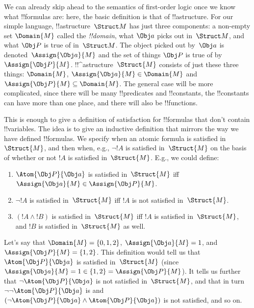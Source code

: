 \documentclass[../../../include/open-logic-section]{subfiles}
\begin{document}

We can already skip ahead to the semantics of first-order logic once
we know what !!{formula}s are: here, the basic definition is that of 
!!a{structure}. For our simple language, !!a{structure}~$\Struct M$ has
just three components: a non-empty set $\Domain{M}$ called the
\emph{!!{domain}}, what $\Obj a$ picks out in~$\Struct M$, and what
$\Obj P$ is true of in~$\Struct M$.  The object picked out by~$\Obj a$
is denoted~$\Assign{\Obj a}{M}$ and the set of things $\Obj P$ is true
of by~$\Assign{\Obj P}{M}$. !!^a{structure}~$\Struct{M}$ consists of
just these three things: $\Domain{M}$, $\Assign{\Obj a}{M} \in
\Domain{M}$ and $\Assign{\Obj P}{M} \subseteq \Domain{M}$. The general
case will be more complicated, since there will be many !!{predicate}s
and !!{constant}s, the !!{constant}s can have more than one place, and
there will also be !!{function}s.

This is enough to give a definition of satisfaction for !!{formula}s
that don't contain !!{variable}s.  The idea is to give an inductive
definition that mirrors the way we have defined !!{formula}s. We
specify when an atomic formula is satisfied in~$\Struct{M}$, and then
when, e.g., $\lnot !A$ is satisfied in~$\Struct{M}$ on the basis of
whether or not $!A$ is satisfied in~$\Struct{M}$. E.g., we could
define:
\begin{enumerate}
  \item $\Atom{\Obj P}{\Obj a}$ is satisfied in~$\Struct{M}$ iff
  $\Assign{\Obj a}{M} \in \Assign{\Obj P}{M}$.
  \item $\lnot !A$ is satisfied in~$\Struct{M}$ iff $!A$ is not
  satisfied in~$\Struct{M}$.
  \item $(!A \land !B)$ is satisfied in~$\Struct{M}$ iff $!A$ is
  satisfied in~$\Struct{M}$, and $!B$ is satisfied in~$\Struct{M}$ as
  well.
\end{enumerate}
Let's say that $\Domain{M} = \{0, 1, 2\}$, $\Assign{\Obj a}{M} = 1$,
and $\Assign{\Obj P}{M} = \{1, 2\}$. This definition would tell us
that $\Atom{\Obj P}{\Obj a}$ is satisfied in~$\Struct{M}$ (since
$\Assign{\Obj a}{M} =  1 \in \{1,2\} = \Assign{\Obj P}{M}$). It tells
us further that $\lnot \Atom{\Obj P}{\Obj a}$ is not satisfied
in~$\Struct{M}$, and that in turn $\lnot\lnot \Atom{\Obj P}{\Obj
a}$ is and $(\lnot \Atom{\Obj P}{\Obj a} \land \Atom{\Obj P}{\Obj a})$
is not satisfied, and so on.
\end{document}
